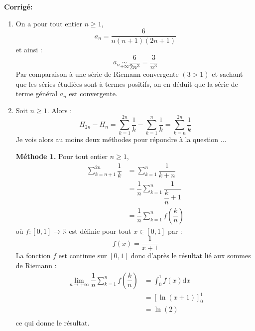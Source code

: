 \documentclass[a4paper,twoside,french,10pt]{VcCours}
\newcommand{\corr}{\textbf{Corrigé:}}
\newcommand{\dx}{\text{d}x}
\begin{document}
\corr 
\begin{enumerate}
\item On a pour tout entier $n \geq 1$,
$$ a_n = \dfrac{6}{n(n+1)(2n+1)}$$
et ainsi :
$$ a_n \underset{+ \infty}{\sim} \dfrac{6}{2n^3}= \dfrac{3}{n^3}$$
Par comparaison à une série de Riemann convergente $(3>1)$ et sachant que les séries étudiées sont à termes positifs, on en déduit que la série de terme général $a_n$ est convergente.
\item Soit $n \geq 1$. Alors :
$$ H_{2n}-H_n = \sum_{k=1}^{2n} \dfrac{1}{k} - \sum_{k=1}^{n} \dfrac{1}{k} = \sum_{k=n}^{2n} \dfrac{1}{k}$$
Je vois alors au moins deux méthodes pour répondre à la question ...

\medskip

\noindent \textbf{Méthode 1.} Pour tout entier $n \geq 1$,
\begin{align*}
\sum_{k=n+1}^{2n} \dfrac{1}{k} & = \sum_{k=1}^{n} \dfrac{1}{k+n} \\
& = \dfrac{1}{n} \sum_{k=1}^{n} \dfrac{1}{\dfrac{k}{n} +1} \\
& =  \dfrac{1}{n} \sum_{k=1}^n f \left( \dfrac{k}{n} \right)
\end{align*}
où $f : [0,1] \rightarrow \mathbb{R}$ est définie pour tout $x \in [0,1]$ par :
$$ f(x) = \dfrac{1}{x+1}$$
La fonction $f$ est continue sur $[0,1]$ donc d'après le résultat lié aux sommes de Riemann :
\begin{align*}
\lim_{n \rightarrow + \infty} \dfrac{1}{n} \sum_{k=1}^n f \left( \dfrac{k}{n} \right) & = \int_{0}^1 f(x) \dx \\
& = \left[\ln(x+1) \right]_0^1 \\
& = \ln(2) \\
\end{align*}
ce qui donne le résultat.

\medskip


\end{enumerate}
\end{document}
